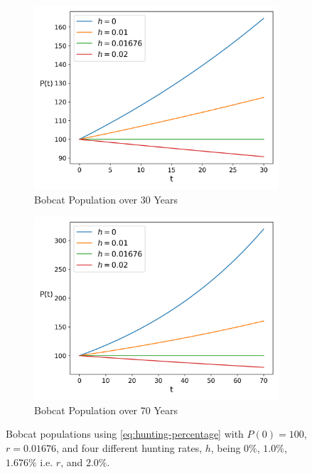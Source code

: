 \documentclass{article}
\begin{document}
\begin{figure}[h]
    \centering
    \begin{subfigure}{.5\textwidth}
        \centering
        \includegraphics[width=.95\linewidth]{./hunting/percentage_short_term.png}
        \caption{Bobcat Population over 30 Years}
        \label{fig:hunting-percentage-short-term}
    \end{subfigure}%
    \begin{subfigure}{.5\textwidth}
        \centering
        \includegraphics[width=.95\linewidth]{./hunting/percentage_long_term.png}
        \caption{Bobcat Population over 70 Years}
        \label{fig:hunting-percentage-long-term}
    \end{subfigure}
    \caption{Bobcat populations using \cref{eq:hunting-percentage} with $P(0) = 100$, $r = 0.01676$, and four different hunting rates, $h$, being $0\%$, $1.0\%$, $1.676\%$ i.e. $r$, and $2.0\%$.}
    \label{fig:2}
\end{figure}
\end{document}
